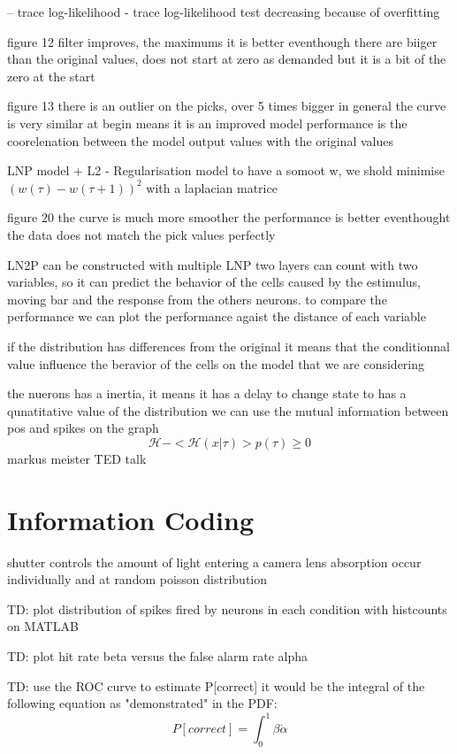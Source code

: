 \documentclass{article}
\begin{document}
-- trace log-likelihood
- trace log-likelihood test decreasing because of overfitting

figure 12
filter
improves, the maximums it is better eventhough there are biiger than the original values, does not start at zero as demanded but it is a bit of the zero at the start

figure 13
there is an outlier on the picks, over 5 times bigger
in general the curve is very similar at begin means it is an improved model
performance is the coorelenation between the model output values with the original values



LNP model + L2 - Regularisation model
to have a somoot w, we shold minimise $(w(\tau) - w(\tau + 1))^2$
with a laplacian matrice 

figure 20
the curve is much more smoother
the performance is better eventhought the data does not match the pick values perfectly

LN2P can be constructed with multiple LNP
two layers can count with two variables, so it can predict the behavior of the cells caused by the estimulus, moving bar and the response from the others neurons. to compare the performance we can plot the performance agaist the distance of each variable

if the distribution has differences from the original it means that the conditionnal value influence the beravior of the cells on the model that we are considering

the nuerons has a inertia, it means it has a delay to change state
to has a qunatitative value of the distribution we can use the mutual information between pos and spikes on the graph
\begin{equation}
    \mathcal{H} - <\mathcal{H}(x|\tau)> p(\tau) \geq 0
\end{equation}
markus meister TED talk

\section{Information Coding}
shutter controls the amount of light entering a camera lens
absorption occur individually and at random poisson distribution

TD: plot distribution of spikes fired by neurons in each condition with histcounts on MATLAB

TD: plot hit rate beta versus the false alarm rate alpha

TD: use the ROC curve to estimate P[correct]
it would be the integral of the following equation as "demonstrated" in the PDF:
\begin{equation}
    P[correct] = \int_{0}^{1} \beta \dot \alpha
\end{equation}
\end{document}
